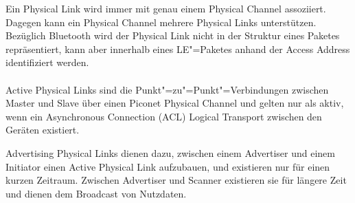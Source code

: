 Ein Physical Link wird immer mit genau einem Physical Channel assoziiert. Dagegen kann ein Physical Channel mehrere Physical Links unterstützen. Bezüglich Bluetooth wird der Physical Link nicht in der Struktur eines Paketes repräsentiert, kann aber innerhalb eines LE"=Paketes anhand der Access Address identifiziert werden. \cite{BtSpec4.0_164}
\\\\
Active Physical Links sind die Punkt"=zu"=Punkt"=Verbindungen zwischen Master und Slave über einen Piconet Physical Channel und gelten nur als aktiv, wenn ein Asynchronous Connection (ACL) Logical Transport zwischen den Geräten existiert. \cite{BtSpec4.0_166-167}

Advertising Physical Links dienen dazu, zwischen einem Advertiser und einem Initiator einen Active Physical Link aufzubauen, und existieren nur für einen kurzen Zeitraum. Zwischen Advertiser und Scanner existieren sie für längere Zeit und dienen dem Broadcast von Nutzdaten. \cite{BtSpec4.0_166-167}